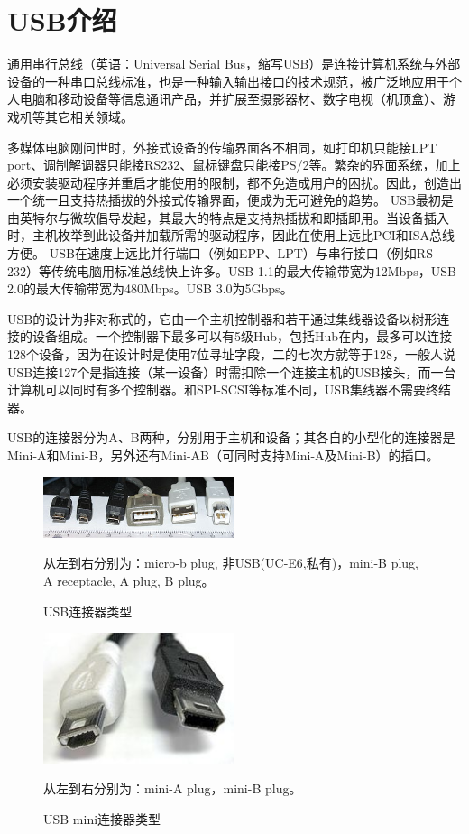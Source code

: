 

\section{USB介绍}

通用串行总线（英语：Universal Serial Bus，缩写USB）是连接计算机系统与外部设备的一种串口总线标准，也是一种输入输出接口的技术规范，被广泛地应用于个人电脑和移动设备等信息通讯产品，并扩展至摄影器材、数字电视（机顶盒）、游戏机等其它相关领域。

多媒体电脑刚问世时，外接式设备的传输界面各不相同，如打印机只能接LPT port、调制解调器只能接RS232、鼠标键盘只能接PS/2等。繁杂的界面系统，加上必须安装驱动程序并重启才能使用的限制，都不免造成用户的困扰。因此，创造出一个统一且支持热插拔的外接式传输界面，便成为无可避免的趋势。
USB最初是由英特尔与微软倡导发起，其最大的特点是支持热插拔和即插即用。当设备插入时，主机枚举到此设备并加载所需的驱动程序，因此在使用上远比PCI和ISA总线方便。
USB在速度上远比并行端口（例如EPP、LPT）与串行接口（例如RS-232）等传统电脑用标准总线快上许多。USB 1.1的最大传输带宽为12Mbps，USB 2.0的最大传输带宽为480Mbps。USB 3.0为5Gbps。

USB的设计为非对称式的，它由一个主机控制器和若干通过集线器设备以树形连接的设备组成。一个控制器下最多可以有5级Hub，包括Hub在内，最多可以连接128个设备，因为在设计时是使用7位寻址字段，二的七次方就等于128，一般人说USB连接127个是指连接（某一设备）时需扣除一个连接主机的USB接头，而一台计算机可以同时有多个控制器。和SPI-SCSI等标准不同，USB集线器不需要终结器。

USB的连接器分为A、B两种，分别用于主机和设备；其各自的小型化的连接器是Mini-A和Mini-B，另外还有Mini-AB（可同时支持Mini-A及Mini-B）的插口。
\begin{figure}[ht]
	\begin{center}
		\includegraphics[keepaspectratio,width=0.5\textwidth]{Hardwares/usb-connectors.jpg}
	\caption{USB连接器类型}
	从左到右分别为：micro-b plug, 非USB(UC-E6,私有)，mini-B plug, A receptacle, A plug, B plug。
	\label{fig:USBconnectors}
	\end{center}
\end{figure}

\begin{figure}[ht]
	\begin{center}
		\includegraphics[keepaspectratio,width=0.5\textwidth]{Hardwares/Mini_usb_AB.jpg}
	\caption{USB mini连接器类型}
	从左到右分别为：mini-A plug，mini-B plug。
	\label{fig:USBconnectors}
	\end{center}
\end{figure}


